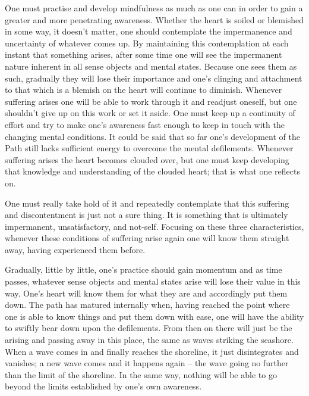 One must practise and develop mindfulness as much as one can in order to gain a greater and more penetrating awareness. Whether the heart is soiled or blemished in some way, it doesn't matter, one should contemplate the impermanence and uncertainty of whatever comes up. By maintaining this contemplation at each instant that something arises, after some time one will see the impermanent nature inherent in all sense objects and mental states. Because one sees them as such, gradually they will lose their importance and one's clinging and attachment to that which is a blemish on the heart will continue to diminish. Whenever suffering arises one will be able to work through it and readjust oneself, but one shouldn't give up on this work or set it aside. One must keep up a continuity of effort and try to make one's awareness fast enough to keep in touch with the changing mental conditions. It could be said that so far one's development of the Path still lacks sufficient energy to overcome the mental defilements. Whenever suffering arises the heart becomes clouded over, but one must keep developing that knowledge and understanding of the clouded heart; that is what one reflects on.

One must really take hold of it and repeatedly contemplate that this suffering and discontentment is just not a sure thing. It is something that is ultimately impermanent, unsatisfactory, and not-self. Focusing on these three characteristics, whenever these conditions of suffering arise again one will know them straight away, having experienced them before. 

Gradually, little by little, one's practice should gain momentum and as time passes, whatever sense objects and mental states arise will lose their value in this way. One's heart will know them for what they are and accordingly put them down. The path has matured internally when, having reached the point where one is able to know things and put them down with ease, one will have the ability to swiftly bear down upon the defilements. From then on there will just be the arising and passing away in this place, the same as waves striking the seashore. When a wave comes in and finally reaches the shoreline, it just disintegrates and vanishes; a new wave comes and it happens again -- the wave going no further than the limit of the shoreline. In the same way, nothing will be able to go beyond the limits established by one's own awareness. 


